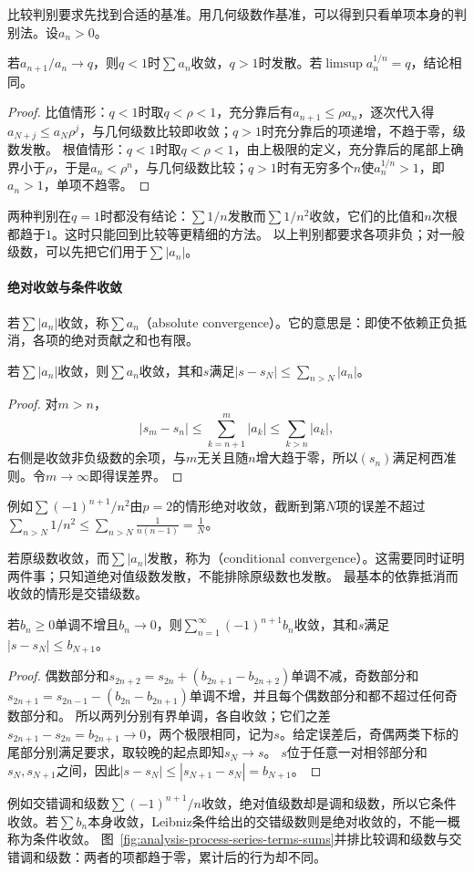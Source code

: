 比较判别要求先找到合适的基准。用几何级数作基准，可以得到只看单项本身的判别法。设$a_n>0$。
\begin{theorem}[比值判别与根值判别]
\label{thm:ru-ratio-root-tests}
若$a_{n+1}/a_n\to q$，则$q<1$时$\sum a_n$收敛，$q>1$时发散。若$\limsup a_n^{1/n}=q$，结论相同。
\end{theorem}
\begin{proof}
比值情形：$q<1$时取$q<\rho<1$，充分靠后有$a_{n+1}\leq\rho a_n$，逐次代入得$a_{N+j}\leq a_N\rho^j$，与几何级数比较即收敛；$q>1$时充分靠后的项递增，不趋于零，级数发散。
根值情形：$q<1$时取$q<\rho<1$，由上极限的定义，充分靠后的尾部上确界小于$\rho$，于是$a_n<\rho^n$，与几何级数比较；$q>1$时有无穷多个$n$使$a_n^{1/n}>1$，即$a_n>1$，单项不趋零。
\end{proof}
两种判别在$q=1$时都没有结论：$\sum1/n$发散而$\sum1/n^2$收敛，它们的比值和$n$次根都趋于$1$。这时只能回到比较等更精细的方法。
以上判别都要求各项非负；对一般级数，可以先把它们用于$\sum|a_n|$。

\paragraph{绝对收敛与条件收敛}
若$\sum|a_n|$收敛，称$\sum a_n$（absolute convergence）。它的意思是：即使不依赖正负抵消，各项的绝对贡献之和也有限。
\begin{theorem}[绝对收敛蕴含收敛]
\label{thm:ru-absolute-convergence}
若$\sum|a_n|$收敛，则$\sum a_n$收敛，其和$s$满足$|s-s_N|\leq\sum_{n>N}|a_n|$。
\end{theorem}
\begin{proof}
对$m>n$，
\[
 |s_m-s_n|\leq\sum_{k=n+1}^m|a_k|\leq\sum_{k>n}|a_k|,
\]
右侧是收敛非负级数的余项，与$m$无关且随$n$增大趋于零，所以$(s_n)$满足柯西准则。令$m\to\infty$即得误差界。
\end{proof}
例如$\sum(-1)^{n+1}/n^2$由$p=2$的情形绝对收敛，截断到第$N$项的误差不超过$\sum_{n>N}1/n^2\leq\sum_{n>N}\frac1{n(n-1)}=\frac1N$。

若原级数收敛，而$\sum|a_n|$发散，称为（conditional convergence）。这需要同时证明两件事；只知道绝对值级数发散，不能排除原级数也发散。
最基本的依靠抵消而收敛的情形是交错级数。
\begin{theorem}[交错级数的Leibniz判别]
\label{thm:ru-leibniz}
若$b_n\geq0$单调不增且$b_n\to0$，则$\sum_{n=1}^\infty(-1)^{n+1}b_n$收敛，其和$s$满足$|s-s_N|\leq b_{N+1}$。
\end{theorem}
\begin{proof}
偶数部分和$s_{2n+2}=s_{2n}+(b_{2n+1}-b_{2n+2})$单调不减，奇数部分和$s_{2n+1}=s_{2n-1}-(b_{2n}-b_{2n+1})$单调不增，并且每个偶数部分和都不超过任何奇数部分和。
所以两列分别有界单调，各自收敛；它们之差$s_{2n+1}-s_{2n}=b_{2n+1}\to0$，两个极限相同，记为$s$。给定误差后，奇偶两类下标的尾部分别满足要求，取较晚的起点即知$s_N\to s$。
$s$位于任意一对相邻部分和$s_N,s_{N+1}$之间，因此$|s-s_N|\leq|s_{N+1}-s_N|=b_{N+1}$。
\end{proof}
例如交错调和级数$\sum(-1)^{n+1}/n$收敛，绝对值级数却是调和级数，所以它条件收敛。若$\sum b_n$本身收敛，Leibniz条件给出的交错级数则是绝对收敛的，不能一概称为条件收敛。
图~\ref{fig:analysis-process-series-terms-sums}并排比较调和级数与交错调和级数：两者的项都趋于零，累计后的行为却不同。

